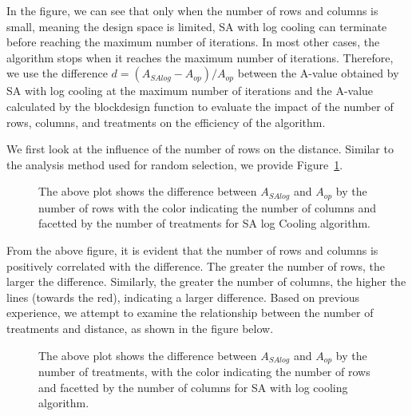 \documentclass[
  a4paper,
  oneside,
  openany,
  12pt,
  onecolumn]{book}
\theoremstyle{definition}
\theoremstyle{definition}
\theoremstyle{plain}
\theoremstyle{remark}
\begin{document}
In the figure, we can see that only when the number of rows and columns
is small, meaning the design space is limited, SA with log cooling can
terminate before reaching the maximum number of iterations. In most
other cases, the algorithm stops when it reaches the maximum number of
iterations. Therefore, we use the difference
\(d = (A_{SAlog}-A_{op})/A_{op}\) between the A-value obtained by SA
with log cooling at the maximum number of iterations and the A-value
calculated by the blockdesign function to evaluate the impact of the
number of rows, columns, and treatments on the efficiency of the
algorithm.

We first look at the influence of the number of rows on the distance.
Similar to the analysis method used for random selection, we provide
Figure~\ref{fig-RvDSAlog}.

\begin{figure}


\caption{\label{fig-RvDSAlog}The above plot shows the difference between
\(A_{SAlog}\) and \(A_{op}\) by the number of rows with the color
indicating the number of columns and facetted by the number of
treatments for SA log Cooling algorithm.}

\end{figure}%

From the above figure, it is evident that the number of rows and columns
is positively correlated with the difference. The greater the number of
rows, the larger the difference. Similarly, the greater the number of
columns, the higher the lines (towards the red), indicating a larger
difference. Based on previous experience, we attempt to examine the
relationship between the number of treatments and distance, as shown in
the figure below.

\begin{figure}


\caption{\label{fig-TvDSAlog}The above plot shows the difference between
\(A_{SAlog}\) and \(A_{op}\) by the number of treatments, with the color
indicating the number of rows and facetted by the number of columns for
SA with log cooling algorithm.}

\end{figure}%
\end{document}
